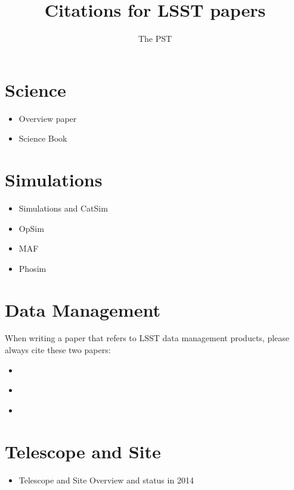 \documentclass[12pt]{book}
\begin{document}
\title{Citations for LSST papers}
\author{The PST}
\maketitle

\tableofcontents


\section{Science}
\begin{itemize}
\item Overview paper \cite{ivezic2008lsst}

\item Science Book \cite{abell2009lsst}
\end{itemize}

\section{Simulations}

\begin{itemize}
\item Simulations and CatSim \cite{2014SPIE.9150E..14C}
 
\item OpSim \cite{2014SPIE.9150E..15D}

\item MAF \cite{2014SPIE.9149E..0BJ}

\item Phosim \cite{2015arXiv150406570P}
\end{itemize}

\section{Data Management}
When writing a paper that refers to LSST data management products, please always cite these two papers:

\begin{itemize}
   \item \cite{ivezic2008lsst}

  \item \cite{DPDD}

  \item \cite{DMDesign}
\end{itemize}
 
\section{Telescope and Site}

\begin{itemize}
   \item Telescope and Site Overview and status in 2014 \cite{2014SPIE.9145E..1AG}
\end{itemize}


\printbibliography[heading=bibintoc]
\end{document}
